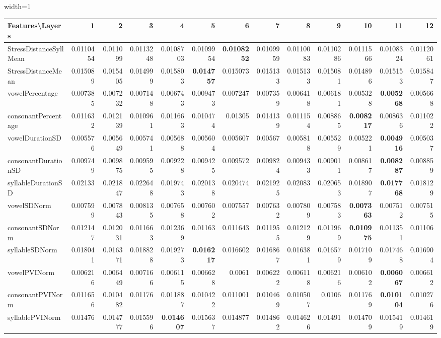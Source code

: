 \documentclass[sigconf]{acmart}
\newcommand{\mj}{Mockingjay\xspace}
\begin{document}
\begin{table*}[]
\begin{adjustbox}{width=1\textwidth}
\begin{tabular}{@{}l|rrrrrrrrrrrr@{}}
\toprule
\textbf{Features\textbackslash{}Layers} & 1 & 2 & 3 & 4 & 5 & 6 & 7 & 8 & 9 & 10 & 11 & 12 \\  \midrule
StressDistanceSyllMean & 0.0110454 & 0.011099 & 0.0113248 & 0.0108703 & 0.0109954 & \textbf{0.0108252} & 0.0109959 & 0.0110083 & 0.0110286 & 0.0111566 & 0.0108324 & 0.0112061 \\
StressDistanceMean & 0.015089 & 0.015405 & 0.014999 & 0.015803 & \textbf{0.014757} & 0.015073 & 0.015133 & 0.015133 & 0.015081 & 0.014896 & 0.015153 & 0.015847 \\
vowelPercentage & 0.007385 & 0.007232 & 0.007148 & 0.006743 & 0.009473 & 0.007247 & 0.007359 & 0.006418 & 0.006181 & 0.005328 & \textbf{0.005268} & 0.005668 \\
consonantPercentage & 0.011632 & 0.012139 & 0.010961 & 0.011663 & 0.010474 & 0.01305 & 0.014139 & 0.011154 & 0.008865 & \textbf{0.008217} & 0.008636 & 0.011022 \\
vowelDurationSD & 0.005576 & 0.005649 & 0.005741 & 0.005688 & 0.005604 & 0.005607 & 0.00567 & 0.005818 & 0.005529 & 0.005221 & \textbf{0.004916} & 0.005037 \\
consonantDurationSD & 0.009749 & 0.009875 & 0.009595 & 0.009228 & 0.009425 & 0.009572 & 0.009824 & 0.009433 & 0.009011 & 0.008617 & \textbf{0.008287} & 0.008859 \\
syllableDurationSD & 0.02133 & 0.021847 & 0.022648 & 0.019743 & 0.020138 & 0.020474 & 0.021925 & 0.02083 & 0.020653 & 0.018907 & \textbf{0.017768} & 0.018129 \\
vowelSDNorm & 0.007599 & 0.007843 & 0.008135 & 0.007658 & 0.007602 & 0.007557 & 0.007632 & 0.007809 & 0.007583 & \textbf{0.007363} & 0.007512 & 0.007515 \\
consonantSDNorm & 0.012147 & 0.012031 & 0.011663 & 0.012369 & 0.01163 & 0.011643 & 0.011955 & 0.012129 & 0.011969 & \textbf{0.010975} & 0.011351 & 0.01106 \\
syllableSDNorm & 0.018041 & 0.016371 & 0.018828 & 0.019273 & \textbf{0.016217} & 0.016602 & 0.016867 & 0.016381 & 0.016579 & 0.017109 & 0.017468 & 0.016904 \\
vowelPVINorm & 0.006216 & 0.006449 & 0.007166 & 0.006115 & 0.006628 & 0.0061 & 0.006222 & 0.006118 & 0.006216 & 0.006102 & \textbf{0.006067} & 0.006612 \\
consonantPVINorm & 0.011656 & 0.010482 & 0.01176 & 0.011887 & 0.010422 & 0.011001 & 0.010469 & 0.010507 & 0.0106 & 0.011769 & \textbf{0.010104} & 0.010276 \\
syllablePVINorm & 0.01476 & 0.014777 & 0.015596 & \textbf{0.014607} & 0.015637 & 0.014877 & 0.014862 & 0.014626 & 0.01491 & 0.014709 & 0.015419 & 0.014619 \\ \bottomrule
\end{tabular}
\end{adjustbox}
\vspace{1 mm}
\caption{\label{nPron_M} \small  Results (MSE) for pronunciation features on {\mj} for non-native read speech corpus (L2 Arctic)}


\end{table*}
\end{document}
